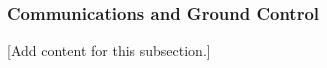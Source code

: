 
\subsubsection{Communications and Ground Control}
\label{subsubsec:design_5_3_communications_ground_control}

[Add content for this subsection.]
